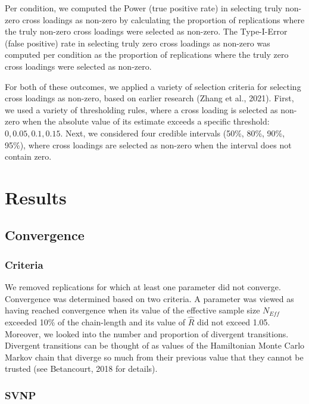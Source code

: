\documentclass[
  man, donotrepeattitle,floatsintext]{apa6}
\begin{document}
Per condition, we computed the Power (true positive rate) in selecting
truly non-zero cross loadings as non-zero by calculating the proportion
of replications where the truly non-zero cross loadings were selected as
non-zero. The Type-I-Error (false positive) rate in selecting truly zero
cross loadings as non-zero was computed per condition as the proportion
of replications where the truly zero cross loadings were selected as
non-zero.

For both of these outcomes, we applied a variety of selection criteria
for selecting cross loadings as non-zero, based on earlier research
(Zhang et al., 2021). First, we used a variety of thresholding rules,
where a cross loading is selected as non-zero when the absolute value of
its estimate exceeds a specific threshold: \(0, 0.05, 0.1, 0.15\). Next,
we considered four credible intervals (50\%, 80\%, 90\%, 95\%), where cross
loadings are selected as non-zero when the interval does not contain
zero.

\section{Results}\label{results}

\subsection{Convergence}\label{convergence}

\subsubsection{Criteria}\label{criteria}

We removed replications for which at least one parameter did not
converge. Convergence was determined based on two criteria. A parameter
was viewed as having reached convergence when its value of the effective
sample size \(N_{Eff}\) exceeded 10\% of the chain-length and its value of
\(\hat{R}\) did not exceed 1.05. Moreover, we looked into the number and
proportion of divergent transitions. Divergent transitions can be
thought of as values of the Hamiltonian Monte Carlo Markov chain that
diverge so much from their previous value that they cannot be trusted
(see Betancourt, 2018 for details).

\subsubsection{SVNP}\label{svnp}
\end{document}
